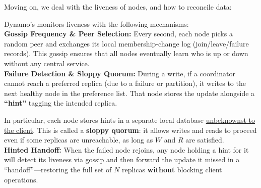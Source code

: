     \noindent
    Moving on, we deal with the liveness of nodes, and how to reconcile data:
    \begin{Def}

        Dynamo's monitors liveness with the following mechanisms:\\
      
        \noindent
        \textbf{Gossip Frequency \& Peer Selection:}  
        Every second, each node picks a random peer and exchanges its local membership-change log (join/leave/failure records). This gossip ensures that all nodes eventually learn who is up or down without any central service.\\
      
        \noindent
        \textbf{Failure Detection \& Sloppy Quorum:}  
        During a write, if a coordinator cannot reach a preferred replica (due to a failure or partition), it writes to the next healthy node in the preference list. That node stores the update alongside a \textbf{``hint''} tagging the intended replica.
        
        In particular, each node stores hints in a separate local database \underline{unbeknownst to the client}. This is called a \textbf{sloppy quorum}: it allows writes and reads to proceed even if some replicas are unreachable, as long as $W$ and $R$ are satisfied.\\
        
      
        \noindent
        \textbf{Hinted Handoff:}  
        When the failed node rejoins, any node holding a hint for it will detect its liveness via gossip and then forward the update it missed in a ``handoff''---restoring the full set of $N$ replicas \textbf{without} blocking client operations.
      \end{Def}

